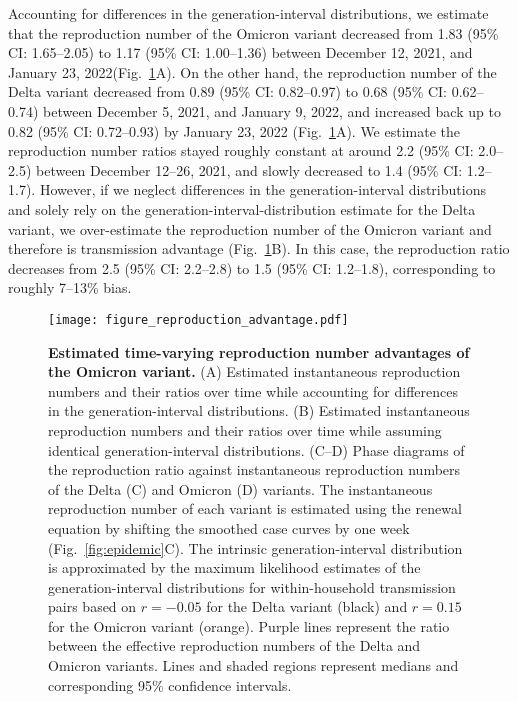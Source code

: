 \documentclass[12pt]{article}
\newcommand{\fref}[1]{Fig.~\ref{fig:#1}}
\begin{document}
Accounting for differences in the generation-interval distributions, we estimate that the reproduction number of the Omicron variant decreased from 1.83 (95\% CI: 1.65--2.05) to 1.17 (95\% CI: 1.00--1.36) between December 12, 2021, and January 23, 2022(\fref{reproduction}A).
On the other hand, the reproduction number of the Delta variant decreased from 0.89 (95\% CI: 0.82--0.97) to 0.68 (95\% CI: 0.62--0.74) between December 5, 2021, and January 9, 2022, and increased back up to 0.82 (95\% CI: 0.72--0.93) by January 23, 2022 (\fref{reproduction}A).
We estimate the reproduction number ratios stayed roughly constant at around 2.2 (95\% CI: 2.0--2.5) between December 12--26, 2021, and slowly decreased to 1.4 (95\% CI: 1.2--1.7).
However, if we neglect differences in the generation-interval distributions and solely rely on the generation-interval-distribution estimate for the Delta variant, we over-estimate the reproduction number of the Omicron variant and therefore is transmission advantage (\fref{reproduction}B).
In this case, the reproduction ratio decreases from 2.5 (95\% CI: 2.2--2.8) to 1.5 (95\% CI: 1.2--1.8), corresponding to roughly 7--13\% bias.

\begin{figure}[!th]
\texttt{[image: figure\_reproduction\_advantage.pdf]}
\caption{
\textbf{Estimated time-varying reproduction number advantages of the Omicron variant.}
(A) Estimated instantaneous reproduction numbers and their ratios over time while accounting for differences in the generation-interval distributions.
(B) Estimated instantaneous reproduction numbers and their ratios over time while assuming identical generation-interval distributions.
(C--D) Phase diagrams of the reproduction ratio against instantaneous reproduction numbers of the Delta (C) and Omicron (D) variants.
The instantaneous reproduction number of each variant is estimated using the renewal equation by shifting the smoothed case curves by one week (\fref{epidemic}C).
The intrinsic generation-interval distribution is approximated by the maximum likelihood estimates of the generation-interval distributions for within-household transmission pairs based on $r=-0.05$ for the Delta variant (black) and $r=0.15$ for the Omicron variant (orange).
Purple lines represent the ratio between the effective reproduction numbers of the Delta and Omicron variants.
Lines and shaded regions represent medians and corresponding 95\% confidence intervals.
\label{fig:reproduction}
}
\end{figure}
\end{document}
